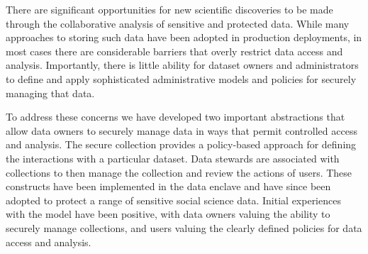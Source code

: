 


There are significant opportunities for new scientific discoveries to be made
through the collaborative analysis of sensitive and protected
data.  While many approaches to storing such data
have been adopted in production deployments, in most cases there are
considerable barriers that overly restrict data access and analysis. 
Importantly, there is little ability for dataset owners and administrators
to define and apply sophisticated administrative models and policies 
for securely managing that data. 

To address these concerns we have developed two important abstractions
that allow data owners to securely manage data in ways that permit
controlled access and analysis. The secure collection provides a 
policy-based approach for defining the interactions with a particular
dataset. Data stewards are associated with collections to then
manage the collection and review the actions of users. These
constructs have been implemented in the \NAME data enclave
and have since been adopted to protect a range of sensitive
social science data. Initial experiences with the model
have been positive, with data owners valuing the ability 
to securely manage collections, and users valuing the clearly
defined policies for data access and analysis. 
